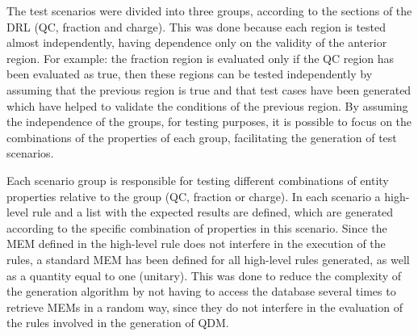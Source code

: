 The test scenarios were divided into three groups, according to the sections of the DRL (QC, fraction and charge). This was done because each region is tested almost independently, having dependence only on the validity of the anterior region. For example: the fraction region is evaluated only if the QC region has been evaluated as true, then these regions can be tested independently by assuming that the previous region is true and that test cases have been generated which have helped to validate the conditions of the previous region. By assuming the independence of the groups, for testing purposes, it is possible to focus on the combinations of the properties of each group, facilitating the generation of test scenarios.


Each scenario group is responsible for testing different combinations of entity properties relative to the group (QC, fraction or charge). In each scenario a high-level rule and a list with the expected results are defined, which are generated according to the specific combination of properties in this scenario. Since the MEM defined in the high-level rule does not interfere in the execution of the rules, a standard MEM has been defined for all high-level rules generated, as well as a quantity equal to one (unitary). This was done to reduce the complexity of the generation algorithm by not having to access the database several times to retrieve MEMs in a random way, since they do not interfere in the evaluation of the rules involved in the generation of QDM.


